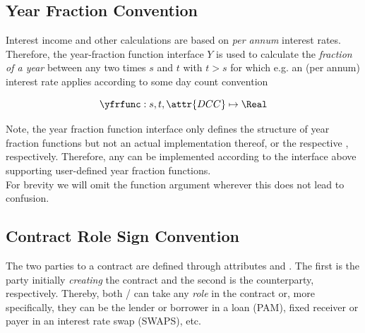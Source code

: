 \subsection{Year Fraction Convention}\label{sec:yearfrac}

Interest income and other calculations are based on \textit{per annum} interest rates. Therefore, the year-fraction function interface $Y$ is used to calculate the \textit{fraction of a year} between any two times $s$ and $t$ with $t>s$ for which e.g. an (per annum) interest rate applies according to some day count convention 

\[
	\yfrfunc: s,t,\attr{DCC} \mapsto \Real
\]

Note, the year fraction function interface only defines the structure of year fraction functions but not an actual implementation thereof, or the respective , respectively. Therefore, any  can be implemented according to the interface above supporting user-defined year fraction functions.\\

For brevity we will omit the  function argument wherever this does not lead to confusion.


\subsection{Contract Role Sign Convention}\label{sec:cntrl}

The two parties to a contract are defined through attributes  and . The first is the party initially \textit{creating} the contract and the second is the counterparty, respectively. Thereby, both / can take any \textit{role} in the contract or, more specifically, they can be the lender or borrower in a loan (PAM), fixed receiver or payer in an interest rate swap (SWAPS), etc.\\
